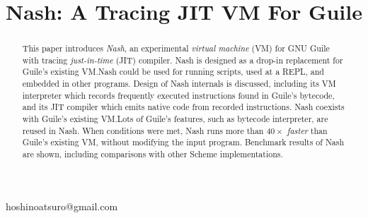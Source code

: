 \documentclass[preprint, 10pt]{sigplanconf}
\begin{document}
\setlength{\pdfpageheight}{\paperheight}
\setlength{\pdfpagewidth}{\paperwidth}





\title{Nash: A Tracing JIT VM For Guile}

           {}
           {hoshinoatsuro@gmail.com}

\maketitle

\begin{abstract}

This paper introduces \textit{Nash}, an experimental \textit{virtual machine}
(VM) for GNU Guile with tracing \textit{just-in-time} (JIT) compiler. Nash is
designed as a drop-in replacement for Guile's existing VM.\@ Nash could be
used for running scripts, used at a REPL, and embedded in other
programs. Design of Nash internals is discussed, including its VM interpreter
which records frequently executed instructions found in Guile's bytecode, and
its JIT compiler which emits native code from recorded instructions. Nash
coexists with Guile's existing VM.\@ Lots of Guile's features, such as
bytecode interpreter, are reused in Nash. When conditions were met, Nash runs
more than \textit{$40\times$ faster} than Guile's existing VM, without
modifying the input program. Benchmark results of Nash are shown, including
comparisons with other Scheme implementations.

\end{abstract}


\end{document}
